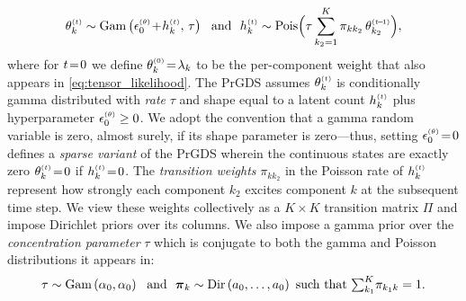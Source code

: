\documentclass{article}
\begin{document}
\begin{equation}
\label{eq:thetaktandhkt}
\thetakt \sim \Gam{\epstheta \tp \hkt,\, \tau} \,\,\textrm{ and }\,\, \hkt \sim \textrm{Pois}\Big(\tau \sum_{k_2 = 1}^K \pi_{kk_2} \,\thetakttm\Big),
\end{equation}
where for $t\!=\! 0$ we define $\theta^{\mathsmaller{(0)}}_k \teq \lambda_k$ to be the per-component weight that also appears in \cref{eq:tensor_likelihood}. The PrGDS assumes $\thetakt$ is conditionally gamma distributed with \emph{rate} $\tau$ and shape equal to a latent count $\hkt$ plus hyperparameter $\epstheta \geq 0$. We adopt the convention that a gamma random variable is zero, almost surely, if its shape parameter is zero---thus, setting $\epstheta \teq 0$ defines a \emph{sparse variant} of the PrGDS wherein the continuous states are exactly zero $\thetakt \teq 0$ if $\hkt \teq 0$. The \emph{transition weights} $\pi_{kk_2}$ in the Poisson rate of $\hkt$ represent how strongly each component $k_2$ excites component $k$ at the subsequent time step. We view these weights collectively as a $K \!\times\! K$ transition matrix $\Pi$ and impose Dirichlet priors over its columns. We also impose a gamma prior over the \emph{concentration parameter} $\tau$ which is conjugate to both the gamma and Poisson distributions it appears in:~
\begin{equation}
\tau \sim \Gam{\alpha_0, \alpha_0} \,\,\textrm{ and }\,\,
\boldsymbol{\pi}_k \sim \textrm{Dir}\left(a_0,\dots,a_0\right) \textrm{ such that }\mathsmaller{\sum_{k_1}}^K \pi_{k_1k}=1.
\end{equation}
\end{document}
